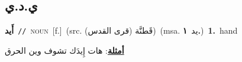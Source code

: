 \documentclass[10pt,a4paper,twoside]{article} %
\begin{document}
\begin{multicols}{2}
\vspace{-3mm}
\subsection*{\color{blue}\foreignlanguage{arabic}{ي.د.ي}\color{blue}{}} 

{\setlength\topsep{0pt}\textbf{\foreignlanguage{arabic}{أَيد}}\ {\color{gray}\texttt{//}\color{black}}\ \textsc{noun}\ [f.]\ (src. \color{gray}\foreignlanguage{arabic}{قَطنَّة (قرى القدس)}\color{black})\ \color{gray}(msa. \foreignlanguage{arabic}{يد}~\foreignlanguage{arabic}{\textbf{١.}})\color{black}\ \textbf{1.}~hand\  \begin{flushright}\color{gray}\foreignlanguage{arabic}{\textbf{\underline{\foreignlanguage{arabic}{أمثلة}}}: هات إِيدَك تشوف وين الحرق}\end{flushright}\color{black}} \vspace{2mm}


\end{multicols}
\end{document}
